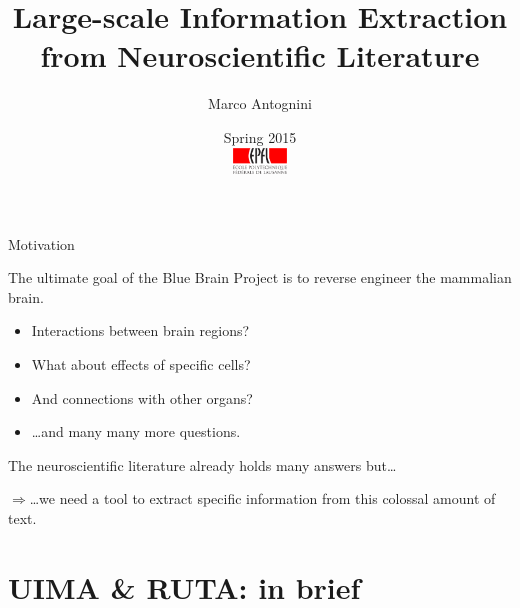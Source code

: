 \documentclass[10pt, compress, xcolor={usenames,dvipsnames}]{beamer}
\title{Large-scale Information Extraction from Neuroscientific Literature}
\author{Marco Antognini}
\date{%
  \small Spring 2015\\[2em]
  \includegraphics[height=7mm]{img/epfl-logo}}
\newcommand{\SmallArrow}{\ding{228}}
\newcommand{\BigArrow}{$\Longrightarrow$} %
\renewcommand{\emph}[1]{\alert{#1}}
\begin{document}
\begin{frame}
  \titlepage
\end{frame}


\begin{frame}[fragile]{Motivation}

  \begin{myquote}
    The ultimate goal of the \emph{Blue Brain Project} is to reverse engineer
    the mammalian brain.
  \end{myquote}

  \pause

  \begin{itemize}[label=\SmallArrow]

    \item Interactions between brain regions?

    \item What about effects of specific cells?

    \item And connections with other organs?

    \item \ldots and many many more questions.

  \end{itemize}


  The neuroscientific \emph{literature} already holds many answers but\ldots

  \pause

  \BigArrow \ldots we need a tool to \emph{extract specific information}
  from this colossal amount of text.

\end{frame}

\section{UIMA \& RUTA: in brief}


\end{document}
